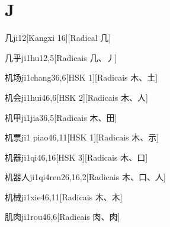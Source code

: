 
\section*{J}

\begin{entry}{几}{ji1}{2}[Kangxi 16][Radical ⼏]
\end{entry}

\begin{entry}{几乎}{ji1hu1}{2,5}[Radicais ⼏、⼃]
\end{entry}

\begin{entry}{机场}{ji1chang3}{6,6}[HSK 1][Radicais ⽊、⼟]
\end{entry}

\begin{entry}{机会}{ji1hui4}{6,6}[HSK 2][Radicais ⽊、⼈]
\end{entry}

\begin{entry}{机甲}{ji1jia3}{6,5}[Radicais ⽊、⽥]
\end{entry}

\begin{entry}{机票}{ji1 piao4}{6,11}[HSK 1][Radicais ⽊、⽰]
\end{entry}

\begin{entry}{机器}{ji1qi4}{6,16}[HSK 3][Radicais ⽊、⼝]
\end{entry}

\begin{entry}{机器人}{ji1qi4ren2}{6,16,2}[Radicais ⽊、⼝、⼈]
\end{entry}

\begin{entry}{机械}{ji1xie4}{6,11}[Radicais ⽊、⽊]
\end{entry}

\begin{entry}{肌肉}{ji1rou4}{6,6}[Radicais ⾁、⾁]
\end{entry}

